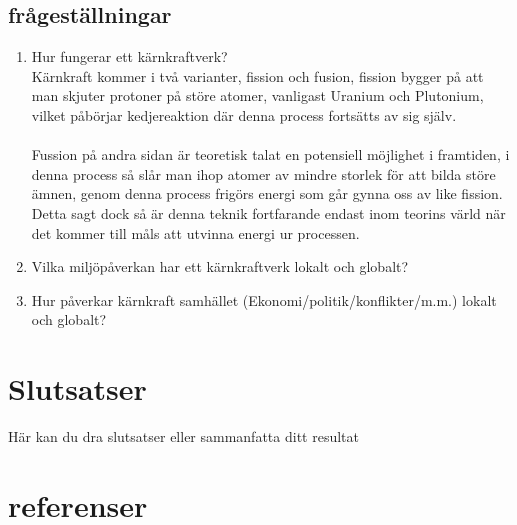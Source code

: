 \documentclass[11pt]{article}
\begin{document}
    \subsection{frågeställningar}
    \begin{enumerate}
        \item Hur fungerar ett kärnkraftverk?\\
        Kärnkraft kommer i två varianter, fission och fusion, fission bygger på att man skjuter protoner på störe atomer, vanligast Uranium och Plutonium, vilket påbörjar kedjereaktion där denna process fortsätts av sig själv.\\
        \\
        Fussion på andra sidan är teoretisk talat en potensiell möjlighet i framtiden, i denna process så slår man ihop atomer av mindre storlek för att bilda störe ämnen, genom denna process frigörs energi som går gynna oss av like fission. Detta sagt dock så är denna teknik fortfarande endast inom teorins värld när det kommer till måls att utvinna energi ur processen.
        \item Vilka miljöpåverkan har ett kärnkraftverk lokalt och globalt?\\

        \item Hur påverkar kärnkraft samhället (Ekonomi/politik/konflikter/m.m.) lokalt och globalt?\\

    \end{enumerate}

    \section{Slutsatser}
    Här kan du dra slutsatser eller sammanfatta ditt resultat

    \section{referenser}
    \printbibliography
\end{document}
